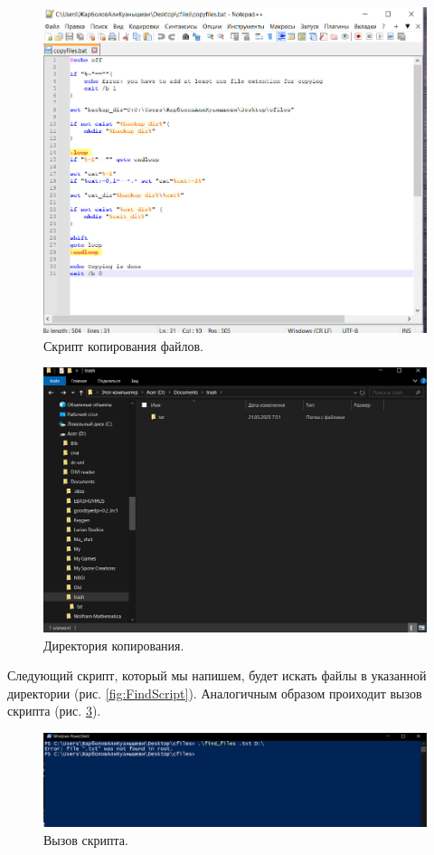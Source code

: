 \begin{figure}[h!]
    \centering
    \includegraphics[width=0.9\linewidth]{Pic/lab1/photo_2025-05-21_08-15-47.jpg}
    \caption{Скрипт копирования файлов.}
    \label{fig:CopeScript}
\end{figure}

\begin{figure}[h!]
    \centering
    \includegraphics[width=0.5\linewidth]{Pic/lab1/photo_2025-05-21_08-15-50.jpg}
    \caption{Директория копирования.}
    \label{fig:CopyResult}
\end{figure}

Следующий скрипт, который мы напишем, будет искать файлы в указанной директории (рис. \ref{fig:FindScript}). Аналогичным образом проиходит вызов скрипта (рис. \ref{fig:FindResult}).

\begin{figure}[h!]
    \centering
    \includegraphics[width=0.5\linewidth]{Pic/lab1/photo_2025-05-21_08-15-53.jpg}
    \caption{Вызов скрипта.}
    \label{fig:FindResult}
\end{figure}

